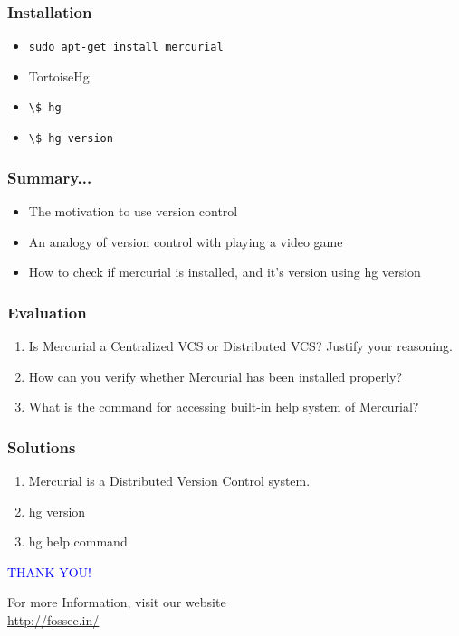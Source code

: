 \documentclass[14pt,compress]{beamer}
\newcommand{\typ}[1]{\lstinline{#1}}
\begin{document}
\begin{frame}
  \frametitle{Installation}
  \begin{itemize}
  \item \typ{sudo apt-get install mercurial}
  \item TortoiseHg
  \item \typ{\$ hg}
  \item \typ{\$ hg version}
  \end{itemize}
\end{frame}

\begin{frame}[fragile]
\frametitle{Summary...}
\begin{itemize}
\item The motivation to use version control
\item An analogy of version control with playing a video game
\item How to check if mercurial is installed, and it's version using hg version
\end{itemize}
\end{frame}

\begin{frame}[fragile]
\frametitle{Evaluation}
\begin{enumerate}
\item Is Mercurial a Centralized VCS or Distributed VCS? Justify your reasoning.
\item How can you verify whether Mercurial has been installed properly?
\item What is the command for accessing built-in help system of Mercurial?
\end{enumerate}
\end{frame}

\begin{frame}
\frametitle{Solutions}
\begin{enumerate}
\item Mercurial is a Distributed Version Control system.
\item hg version  	
\item hg help command	
\end{enumerate}
\end{frame}
\begin{frame}

\begin{block}{}
  \begin{center}
  \textcolor{blue}{\Large THANK YOU!} 
  \end{center}
  \end{block}
\begin{block}{}
  \begin{center}
    For more Information, visit our website\\
    \url{http://fossee.in/}
  \end{center}  
  \end{block}
\end{frame}
\end{document}

